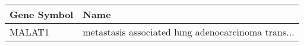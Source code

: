 \begin{tabular}{ll}
\toprule
Gene Symbol &                                               Name \\
\midrule
     MALAT1 & metastasis associated lung adenocarcinoma trans... \\
\bottomrule
\end{tabular}
